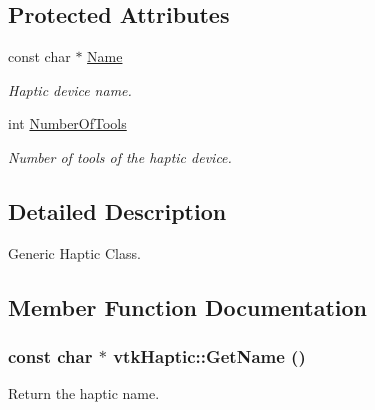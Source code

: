 \subsection*{Protected Attributes}
\begin{DoxyCompactItemize}
\item 
\hypertarget{classvtkHaptic_a219429c7185471e84c9ea33275c0ab32}{
const char $\ast$ \hyperlink{classvtkHaptic_a219429c7185471e84c9ea33275c0ab32}{Name}}
\label{classvtkHaptic_a219429c7185471e84c9ea33275c0ab32}

\begin{DoxyCompactList}\small\item\em Haptic device name. \item\end{DoxyCompactList}\item 
\hypertarget{classvtkHaptic_a4837e3d8ae7cce4cc3ff8851409176bd}{
int \hyperlink{classvtkHaptic_a4837e3d8ae7cce4cc3ff8851409176bd}{NumberOfTools}}
\label{classvtkHaptic_a4837e3d8ae7cce4cc3ff8851409176bd}

\begin{DoxyCompactList}\small\item\em Number of tools of the haptic device. \item\end{DoxyCompactList}\end{DoxyCompactItemize}


\subsection{Detailed Description}
Generic Haptic Class. 

\subsection{Member Function Documentation}
\hypertarget{classvtkHaptic_abdf00bb1f22ee8c984982c4e90c729a5}{
\subsubsection[{GetName}]{\setlength{\rightskip}{0pt plus 5cm}const char $\ast$ vtkHaptic::GetName ()}}
\label{classvtkHaptic_abdf00bb1f22ee8c984982c4e90c729a5}


Return the haptic name. 

